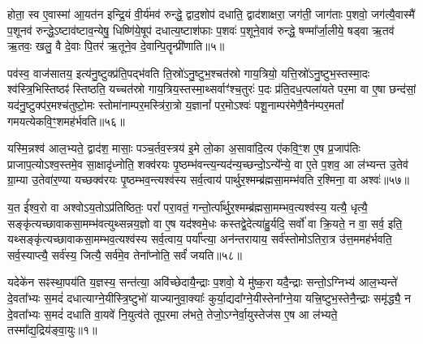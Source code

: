होता॒ स्व ए॒वास्मा॑ आ॒यत॑न इन्द्रि॒यं वी॒र्य॑मव॑ रुन्द्धे॒ द्वाद॒शोप॑ दधाति॒ द्वाद॑शाक्षरा॒ जग॑ती॒ जाग॑ताः प॒शवो॒ जग॑त्यै॒वास्मै॑ प॒शूनव॑ रुन्द्धे॒\-ऽष्टाव॑ष्टाव॒न्येषु॒ धिष्णि॑ये॒षूप॑ दधात्य॒ष्टाश॑फाः प॒शवः॑ प॒शूने॒वाव॑ रुन्द्धे॒ षण्मा᳚र्जा॒लीये॒ षड्वा ऋ॒तव॑ ऋ॒तवः॒ खलु॒ वै दे॒वाः पि॒तर॑ ऋ॒तूने॒व दे॒वान्पि॒तॄन्प्री॑णाति॥५॥

{}

पव॑स्व॒ वाज॑सातय॒ इत्य॑नु॒ष्टुक्प्र॑ति॒पद्भ॑वति ति॒स्रो॑\-ऽनु॒ष्टुभ॒श्चत॑स्रो गाय॒त्रियो॒ यत्ति॒स्रो॑\-ऽनु॒ष्टुभ॒स्तस्मा॒दः श्व॑स्त्रि॒भिस्तिष्ठꣴ॑ स्तिष्ठति॒ यच्चत॑स्रो गाय॒त्रिय॒स्तस्मा॒थ्सर्वाꣳ॑श्च॒तुरः॑ प॒दः प्र॑ति॒दध॒त्पला॑यते पर॒मा वा ए॒षा छन्द॑सां॒ यद॑नु॒ष्टुक्प॑र॒मश्च॑तुष्टो॒मः स्तोमा॑नाम्पर॒मस्त्रि॑रा॒त्रो य॒ज्ञानां᳚ पर॒मो\-ऽश्वः॑ पशू॒नाम्पर॑मेणै॒वैन॑म्पर॒मतां᳚ गमयत्येकवि॒ꣳ॒शमह॑र्भवति॥५६॥

यस्मि॒न्नश्व॑ आल॒भ्यते॒ द्वाद॑श॒ मासाः॒ पञ्च॒र्तव॒स्त्रय॑ इ॒मे लो॒का अ॒सावा॑दि॒त्य ए॑कवि॒ꣳ॒श ए॒ष प्र॒जाप॑तिः प्राजाप॒त्यो\-ऽश्व॒स्तमे॒व सा॒क्षादृ॑ध्नोति॒ शक्व॑रयः पृ॒ष्ठम्भ॑वन्त्य॒न्यद॑न्य॒च्छन्दो॒\-ऽन्ये᳚न्ये॒ वा ए॒ते प॒शव॒ आ ल॑भ्यन्त उ॒तेव॑ ग्रा॒म्या उ॒तेवा॑र॒ण्या यच्छक्व॑रयः पृ॒ष्ठम्भव॒न्त्यश्व॑स्य सर्व॒त्वाय॑ पार्थुर॒श्मम्ब्र॑ह्मसा॒मम्भ॑वति र॒श्मिना॒ वा अश्वः॑॥५७॥

य॒त ई᳚श्व॒रो वा अश्वो\-ऽय॒तो\-ऽप्र॑तिष्ठितः॒ परां᳚ परा॒वतं॒ गन्तो॒र्त्पा᳚र्थुर॒श्मम्ब्र॑ह्मसा॒मम्भव॒त्यश्व॑स्य॒ यत्यै॒ धृत्यै॒ सङ्कृ॑त्यच्छावाकसा॒मम्भ॑वत्युथ्सन्नय॒ज्ञो वा ए॒ष यद॑श्वमे॒धः कस्तद्वे॒देत्या॑हु॒र्यदि॒ सर्वो॑ वा क्रि॒यते॒ न वा॒ सर्व॒ इति॒ यथ्सङ्कृ॑त्यच्छावाकसा॒मम्भव॒त्यश्व॑स्य सर्व॒त्वाय॒ पर्या᳚प्त्या॒ अन॑न्तरायाय॒ सर्व॑स्तोमो\-ऽतिरा॒त्र उ॑त्त॒ममह॑र्भवति॒ सर्व॒स्याप्त्यै॒ सर्व॑स्य॒ जित्यै॒ सर्व॑मे॒व तेना᳚प्नोति॒ सर्वं॑ जयति॥५८॥

{}


{}

\setcounter{anuvakam}{0}
यदेके॑न सꣴस्था॒पय॑ति य॒ज्ञस्य॒ सन्त॑त्या॒ अवि॑च्छेदायै॒न्द्राः प॒शवो॒ ये मु॑ष्क॒रा यदै॒न्द्राः सन्तो॒\-ऽग्निभ्य॑ आल॒भ्यन्ते॑ दे॒वता᳚भ्यः स॒मदं॑ दधात्याग्ने॒यीस्त्रि॒ष्टुभो॑ याज्यानुवा॒क्याः᳚ कुर्या॒द्यदा᳚ग्ने॒यीस्तेना᳚ग्ने॒या यत्त्रि॒ष्टुभ॒स्तेनै॒न्द्राः समृ॑द्ध्यै॒ न दे॒वता᳚भ्यः स॒मदं॑ दधाति वा॒यवे॑ नि॒युत्व॑ते तूप॒रमा ल॑भते॒ तेजो॒\-ऽग्नेर्वा॒युस्तेज॑स ए॒ष आ ल॑भ्यते॒ तस्मा᳚द्य॒द्रिय॑ङ्वा॒युः॥१॥

